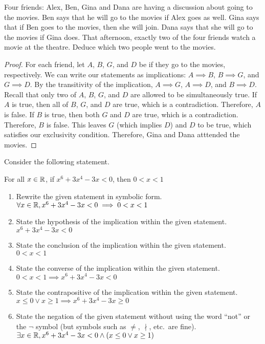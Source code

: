 \documentclass{agony}
\begin{document}
\question Four friends: Alex, Ben, Gina and Dana are having a discussion about going to the movies.
Ben says that he will go to the movies if Alex goes as well.
Gina says that if Ben goes to the movies, then she will join.
Dana says that she will go to the movies if Gina does.
That afternoon, exactly two of the four friends watch a movie at the theatre.
Deduce which two people went to the movies.
\begin{proof}
  For each friend, let $A$, $B$, $G$, and $D$ be if they go to the movies, respectively.
  We can write our statements as implications: $A \implies B$, $B \implies G$, and $G \implies D$.
  By the transitivity of the implication, $A \implies G$, $A \implies D$, and $B \implies D$.
  Recall that only two of $A$, $B$, $G$, and $D$ are allowed to be simultaneously true.
  If $A$ is true, then all of $B$, $G$, and $D$ are true, which is a contradiction.
  Therefore, $A$ is false.
  If $B$ is true, then both $G$ and $D$ are true, which is a contradiction.
  Therefore, $B$ is false.
  This leaves $G$ (which implies $D$) and $D$ to be true, which satisfies our exclusivity condition.
  Therefore, Gina and Dana atttended the movies.
\end{proof}


\question Consider the following statement.
\begin{center}
  For all $x\in\mathbb{R}$, if $x^6 + 3x^4 - 3x < 0$, then $0 < x < 1$
\end{center}
\begin{enumerate}
  \item Rewrite the given statement in symbolic form. \\
        $\forall x\in\mathbb{R}, x^6 + 3x^4 - 3x < 0 \implies 0 < x < 1$
  \item State the hypothesis of the implication within the given statement. \\
        $x^6 + 3x^4 - 3x < 0$
  \item State the conclusion of the implication within the given statement. \\
        $0 < x < 1$
  \item State the converse of the implication within the given statement. \\
        $0 < x < 1 \implies x^6 + 3x^4 - 3x < 0$
  \item State the contrapositive of the implication within the given statement. \\
        $x \leq 0 \lor x \geq 1 \implies x^6 + 3x^4 - 3x \geq 0$
  \item State the negation of the given statement without using the word ``not'' or the $\lnot$ symbol (but symbols such as $\neq$, $\nmid$, etc.\ are fine). \\
        $\exists x\in\mathbb{R}, x^6 + 3x^4 - 3x < 0 \land (x \leq 0 \lor x \geq 1)$
\end{enumerate}
\end{document}
